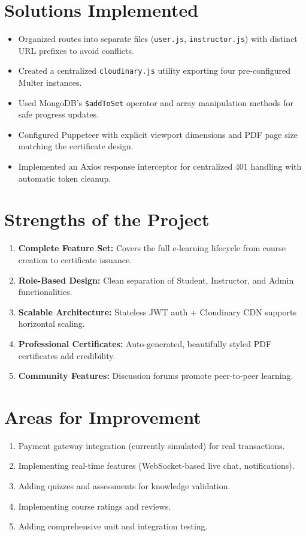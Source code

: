 \documentclass[12pt,a4paper]{report}
\begin{document}
\section{Solutions Implemented}
\begin{itemize}
    \item Organized routes into separate files (\texttt{user.js}, \texttt{instructor.js}) with distinct URL prefixes to avoid conflicts.
    \item Created a centralized \texttt{cloudinary.js} utility exporting four pre-configured Multer instances.
    \item Used MongoDB's \texttt{\$addToSet} operator and array manipulation methods for safe progress updates.
    \item Configured Puppeteer with explicit viewport dimensions and PDF page size matching the certificate design.
    \item Implemented an Axios response interceptor for centralized 401 handling with automatic token cleanup.
\end{itemize}

\section{Strengths of the Project}
\begin{enumerate}
    \item \textbf{Complete Feature Set:} Covers the full e-learning lifecycle from course creation to certificate issuance.
    \item \textbf{Role-Based Design:} Clean separation of Student, Instructor, and Admin functionalities.
    \item \textbf{Scalable Architecture:} Stateless JWT auth + Cloudinary CDN supports horizontal scaling.
    \item \textbf{Professional Certificates:} Auto-generated, beautifully styled PDF certificates add credibility.
    \item \textbf{Community Features:} Discussion forums promote peer-to-peer learning.
\end{enumerate}

\section{Areas for Improvement}
\begin{enumerate}
    \item Payment gateway integration (currently simulated) for real transactions.
    \item Implementing real-time features (WebSocket-based live chat, notifications).
    \item Adding quizzes and assessments for knowledge validation.
    \item Implementing course ratings and reviews.
    \item Adding comprehensive unit and integration testing.
\end{enumerate}
\end{document}
